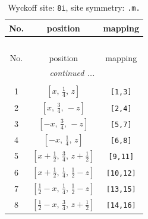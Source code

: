 \documentclass[fleqn,8pt]{jsarticle}
\begin{document}
\begin{longtable}{ccc}
\caption{Wyckoff site: {\tt 8i}, site symmetry: {\tt .m.}}
 \\
 \hline \hline
No. & position & mapping \\ \hline \endfirsthead

\multicolumn{2}{l}{\tablename\ \thetable{}} \\
 \hline \hline
No. & position & mapping \\ \hline \endhead

 \hline \hline
\multicolumn{2}{r}{\footnotesize\it continued ...} \\ \endfoot

 \hline \hline
\multicolumn{2}{r}{} \\ \endlastfoot

1 & $\left[ x,\, \frac{1}{4},\, z \right]$ & {\tt [1,3]} \\ \hline
2 & $\left[ x,\, \frac{3}{4},\, - z \right]$ & {\tt [2,4]} \\ \hline
3 & $\left[ - x,\, \frac{3}{4},\, - z \right]$ & {\tt [5,7]} \\ \hline
4 & $\left[ - x,\, \frac{1}{4},\, z \right]$ & {\tt [6,8]} \\ \hline
5 & $\left[ x + \frac{1}{2},\, \frac{3}{4},\, z + \frac{1}{2} \right]$ & {\tt [9,11]} \\ \hline
6 & $\left[ x + \frac{1}{2},\, \frac{1}{4},\, \frac{1}{2} - z \right]$ & {\tt [10,12]} \\ \hline
7 & $\left[ \frac{1}{2} - x,\, \frac{1}{4},\, \frac{1}{2} - z \right]$ & {\tt [13,15]} \\ \hline
8 & $\left[ \frac{1}{2} - x,\, \frac{3}{4},\, z + \frac{1}{2} \right]$ & {\tt [14,16]} \\
\end{longtable}
\renewcommand{\arraystretch}{1.2}
\end{document}
